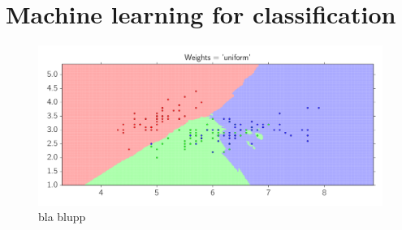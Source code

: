 \section{Machine learning for classification}
\begin{figure}[htpb]
    \centering
    \includegraphics[width=1\linewidth]{figures/kneigbors}
    \caption{bla blupp}
\label{fig:kneigbors}
\end{figure}
